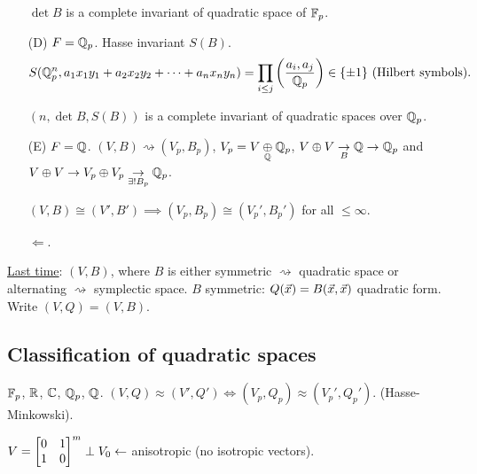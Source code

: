 \documentclass[]{article}
\begin{document}
\begin{itemize}
	\begin{theorem}
		$\det B$ is a complete invariant of quadratic space of $\mathbb{F}_p$.
	\end{theorem}
	\item[(D)] $F = \mathbb{Q}_p$. Hasse invariant $S(B)$. $$S(\mathbb{Q}_p^n, a_1x_1y_1 + a_2x_2y_2 + \dots + a_nx_ny_n) = \prod_{i\leq j} \left(\frac{a_i,a_j}{\mathbb{Q}_p}\right) \in \{\pm 1\} \text{ (Hilbert symbols)}.$$
	\begin{theorem}
		$(n,\det B, S(B))$ is a complete invariant of quadratic spaces over $\mathbb{Q}_p$.
	\end{theorem}
	\item[(E)] $F = \mathbb{Q}$. $(V,B) \rightsquigarrow (V_p,B_p)$, $V_p = V\underset{\mathbb{Q}}{\oplus} \mathbb{Q}_p$, $V\oplus V \underset{B}{\rightarrow} \mathbb{Q} \rightarrow \mathbb{Q}_p$ and $V\oplus V \rightarrow V_p\oplus V_p \underset{\exists !B_p}{\rightarrow} \mathbb{Q}_p$.
	
	$(V,B) \cong (V',B') \implies (V_p,B_p) \cong (V_p',B_p')$ for all $\leq \infty$.
	\begin{theorem}
		 $\Longleftarrow$.
	\end{theorem}
\end{itemize}


\ul{Last time}: $(V,B)$, where $B$ is either symmetric $\rightsquigarrow$ quadratic space or alternating $\rightsquigarrow$ symplectic space. $B$ symmetric: $Q(\vec{x}) = B(\vec{x},\vec{x})$ quadratic form. Write $(V,Q) = (V,B)$.

\subsection*{Classification of quadratic spaces}

$\mathbb{F}_p$, $\mathbb{R}$, $\mathbb{C}$, $\mathbb{Q}_p$, $\mathbb{Q}$. $(V,Q) \approx (V',Q') \iff (V_p,Q_p) \approx (V_p',Q_p')$. (Hasse-Minkowski).

\begin{theorem}
	 $V = \begin{bmatrix}0&1\\1&0\end{bmatrix}^m \perp V_0 \leftarrow$ anisotropic (no isotropic vectors).
\end{theorem}
\end{document}
